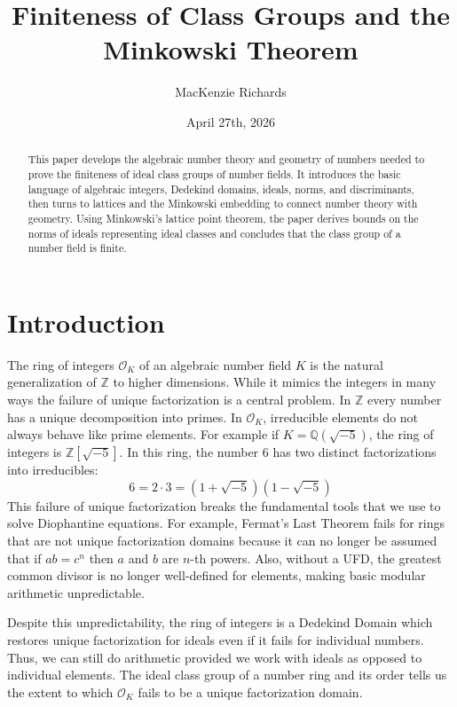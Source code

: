 \documentclass[12pt]{article}
\title{Finiteness of Class Groups and the Minkowski Theorem}
\author{MacKenzie Richards}
\date{April 27th, 2026}
\theoremstyle{definition}
\begin{document}
\maketitle

\begin{abstract}
This paper develops the algebraic number theory and geometry of numbers needed to prove the finiteness of 
ideal class groups of number fields. It introduces the basic language of algebraic integers, Dedekind domains, ideals, 
norms, and discriminants, then turns to lattices and the Minkowski embedding to connect number theory with geometry. 
Using Minkowski's lattice point theorem, the paper derives bounds on the norms of ideals representing ideal classes and 
concludes that the class group of a number field is finite. 
\end{abstract}


\section{Introduction}
\label{sec:intro}
The ring of integers $\mathcal{O}_K$ of an algebraic number field $K$ is the natural generalization of $\mathbb{Z}$ to higher dimensions. While
it mimics the integers in many ways the failure of unique factorization is a central problem. In $\mathbb{Z}$ every number has a unique decomposition into
primes. In $\mathcal{O}_K$, irreducible elements do not always behave like prime elements. For example if $K = \mathbb{Q}(\sqrt{-5})$, 
the ring of integers is $\mathbb{Z}[\sqrt{-5}]$. In this ring, the number 6 has two distinct factorizations into irreducibles:
\[6 = 2 \cdot 3 = (1 + \sqrt{-5})(1 - \sqrt{-5})\]
This failure of unique factorization breaks the fundamental tools that we use to solve Diophantine equations. For example, Fermat's Last Theorem
fails for rings that are not unique factorization domains because it can no longer be assumed that if $ab=c^n$ then $a$ and $b$ are $n$-th powers. Also,
without a UFD, the greatest common divisor is no longer well-defined for elements, making basic modular arithmetic unpredictable. 

Despite this unpredictability, the ring of integers is a Dedekind Domain which restores unique factorization for ideals even if it fails for individual numbers. 
Thus, we can still do arithmetic provided we work with ideals as opposed to individual elements. The ideal class group of a number ring and its order
tells us the extent to which $\mathcal{O}_K$ fails to be a unique factorization domain. 
\end{document}
